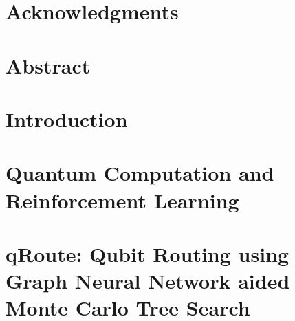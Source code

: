 \documentclass[11pt]{book}
\renewcommand{\baselinestretch}{1.2}
\begin{document}



\newpage
\thispagestyle{empty}
\renewcommand{\thesisdedication}{{\large Copyright \copyright~~Animesh Sinha, 2022\\}{\large All Rights Reserved\\}}
\thesisdedicationpage



\newpage
\thispagestyle{empty}
\renewcommand{\thesisdedication}{\large To Compute}
\thesisdedicationpage

\mastersthesis
\renewcommand{\baselinestretch}{1.5}

\chapter*{Acknowledgments}
\label{ch:ack}


\chapter*{Abstract}
\label{ch:abstract}


\tableofcontents
\listoffigures
\listoftables


\chapter{Introduction}
\label{ch:intro}



\chapter{Quantum Computation and Reinforcement Learning}
\label{ch:background}



\chapter{qRoute: Qubit Routing using Graph Neural Network aided Monte Carlo Tree Search}
\label{ch:qroute}

\end{document}
